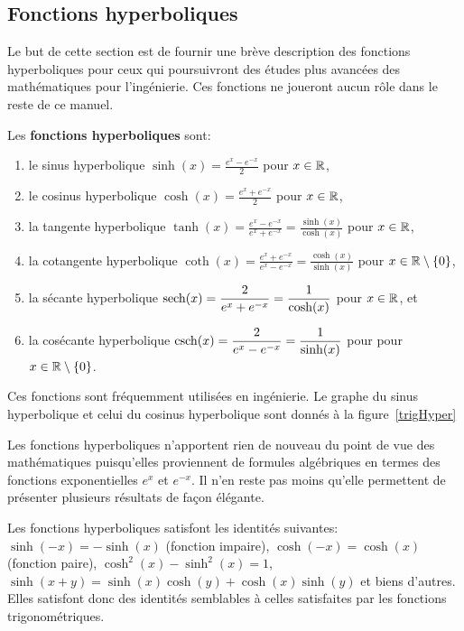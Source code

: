 {\subsection{Fonctions hyperboliques \eng}

Le but de cette section est de fournir une brève description des
fonctions hyperboliques pour ceux qui poursuivront des études plus
avancées des mathématiques pour l'ingénierie.  Ces fonctions ne
joueront aucun rôle dans le reste de ce manuel.

Les {\bfseries fonctions hyperboliques} 
sont:
\begin{enumerate}
\item le sinus hyperbolique $\displaystyle \sinh(x) = \frac{e^x - e^{-x}}{2}$
pour $x\in \mathbb{R}$,
\item le cosinus hyperbolique $\displaystyle \cosh(x) = \frac{e^x + e^{-x}}{2}$
pour $x\in \mathbb{R}$,
\item la tangente hyperbolique $\displaystyle
\tanh(x) = \frac{e^x - e^{-x}}{e^x + e^{-x}} = \frac{\sinh(x)}{\cosh(x)}$
pour $x\in \mathbb{R}$,
\item la cotangente hyperbolique $\displaystyle
\coth(x) = \frac{e^x + e^{-x}}{e^x - e^{-x}} = \frac{\cosh(x)}{\sinh(x)}$
pour $x\in \mathbb{R}\setminus \{0\}$,
\item la sécante hyperbolique $\displaystyle
\operatorname{sech}(x) = \frac{2}{e^x + e^{-x}} = \frac{1}{\cosh(x)}$ pour $x\in \mathbb{R}$, et
\item la cosécante hyperbolique $\displaystyle
\operatorname{csch}(x) = \frac{2}{e^x - e^{-x}} = \frac{1}{\sinh(x)}$ pour
pour $x\in \mathbb{R}\setminus\{0\}$.
\end{enumerate}
Ces fonctions sont fréquemment utilisées en ingénierie.  Le graphe du
sinus hyperbolique et celui du cosinus hyperbolique sont donnés à la
figure~\ref{trigHyper}


Les fonctions hyperboliques n'apportent rien de nouveau du point de
vue des mathématiques puisqu'elles proviennent de formules algébriques
en termes des fonctions exponentielles $e^x$ et $e^{-x}$.  Il n'en
reste pas moins qu'elle permettent de présenter plusieurs résultats de
façon élégante.

Les fonctions hyperboliques satisfont les identités suivantes:
$\displaystyle \sinh(-x) = -\sinh(x)$ (fonction impaire),
$\displaystyle \cosh(-x) = \cosh(x)$ (fonction paire),
$\displaystyle \cosh^2(x) - \sinh^2(x) = 1$,
$\displaystyle \sinh(x+y) = \sinh(x) \cosh(y) + \cosh(x)\sinh(y)$ et
biens d'autres.  Elles satisfont donc des identités semblables à
celles satisfaites par les fonctions trigonométriques.

}
